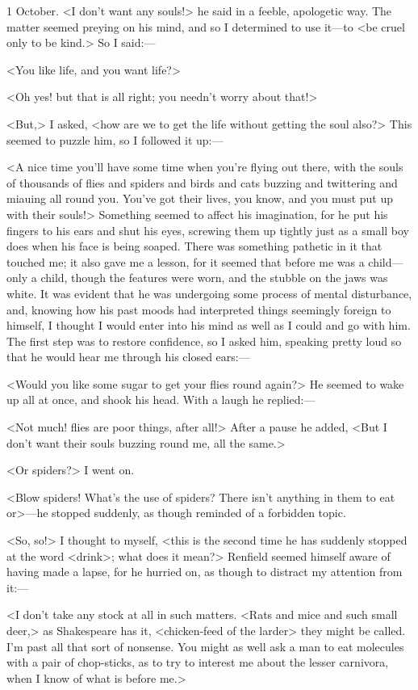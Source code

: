 \begin{diary}{1 October.}
<I don't want any souls!> he said in a feeble, apologetic way. The matter seemed preying on his mind, and so I determined to use it—to <be cruel only to be kind.> So I said:—

<You like life, and you want life?>

<Oh yes! but that is all right; you needn't worry about that!>

<But,> I asked, <how are we to get the life without getting the soul also?> This seemed to puzzle him, so I followed it up:—

<A nice time you'll have some time when you're flying out there, with the souls of thousands of flies and spiders and birds and cats buzzing and twittering and miauing all round you. You've got their lives, you know, and you must put up with their souls!> Something seemed to affect his imagination, for he put his fingers to his ears and shut his eyes, screwing them up tightly just as a small boy does when his face is being soaped. There was something pathetic in it that touched me; it also gave me a lesson, for it seemed that before me was a child—only a child, though the features were worn, and the stubble on the jaws was white. It was evident that he was undergoing some process of mental disturbance, and, knowing how his past moods had interpreted things seemingly foreign to himself, I thought I would enter into his mind as well as I could and go with him. The first step was to restore confidence, so I asked him, speaking pretty loud so that he would hear me through his closed ears:—

<Would you like some sugar to get your flies round again?> He seemed to wake up all at once, and shook his head. With a laugh he replied:—

<Not much! flies are poor things, after all!> After a pause he added, <But I don't want their souls buzzing round me, all the same.>

<Or spiders?> I went on.

<Blow spiders! What's the use of spiders? There isn't anything in them to eat or>—he stopped suddenly, as though reminded of a forbidden topic.

<So, so!> I thought to myself, <this is the second time he has suddenly stopped at the word <drink>; what does it mean?> Renfield seemed himself aware of having made a lapse, for he hurried on, as though to distract my attention from it:—

<I don't take any stock at all in such matters. <Rats and mice and such small deer,> as Shakespeare has it, <chicken-feed of the larder> they might be called. I'm past all that sort of nonsense. You might as well ask a man to eat molecules with a pair of chop-sticks, as to try to interest me about the lesser carnivora, when I know of what is before me.>


\end{diary}
